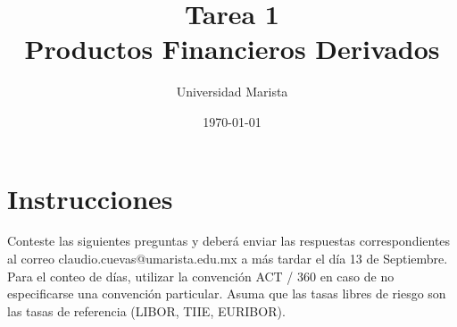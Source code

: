 \documentclass{article}
\title{Tarea 1 \\ Productos Financieros Derivados}
\author{Universidad Marista}
\date{\today}
\begin{document}
\maketitle


\section{Instrucciones}
Conteste las siguientes preguntas y deberá enviar las respuestas correspondientes
al correo claudio.cuevas@umarista.edu.mx a más tardar el día 13 de Septiembre. Para el conteo de días, utilizar
la convención ACT / 360 en caso de no especificarse una convención particular. Asuma que las tasas libres de riesgo son las tasas de referencia (LIBOR, TIIE, EURIBOR).


\section*{} 
\end{document}
